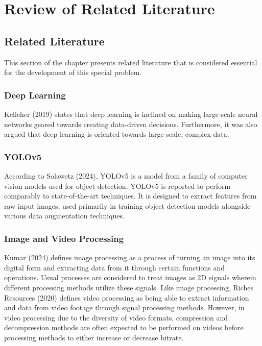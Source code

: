 \documentclass{report} %
\begin{document}
	
	\chapter{Review of Related Literature}
	
	\section{Related Literature}
	This section of the chapter presents related literature that is considered essential for the development of this special problem.
	
	\subsection{Deep Learning}
	Kelleher (2019) states that deep learning is inclined on making large-scale neural networks geared towards creating data-driven decisions. Furthermore, it was also argued that deep learning is oriented towards large-scale, complex data.
	
	\subsection{YOLOv5}
	According to Solawetz (2024), YOLOv5 is a model from a family of computer vision models used for object detection. YOLOv5 is reported to perform comparably to state-of-the-art techniques. It is designed to extract features from raw input images, used primarily in training object detection models alongside various data augmentation techniques.
	
	\subsection{Image and Video Processing}
	
	Kumar (2024) defines image processing as a process of turning an image into its digital form and extracting data from it through certain functions and operations. Usual processes are considered to treat images as 2D signals wherein different processing methods utilize these signals.
	Like image processing, Riches Resources (2020) defines video processing as being able to extract information and data from video footage through signal processing methods. However, in video processing due to the diversity of video formats, compression and decompression methods are often expected to be performed on videos before processing methods to either increase or decrease bitrate.
	
\end{document}
